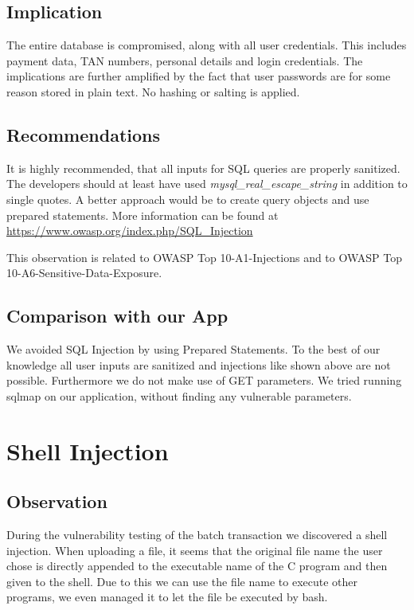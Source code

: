 \subsection{Implication}
The entire database is compromised, along with all user credentials. This includes payment data, TAN numbers, personal details and login credentials. The implications are further amplified by the fact that user passwords are for some reason stored in plain text. No hashing or salting is applied.

\subsection{Recommendations}
It is highly recommended, that all inputs for SQL queries are properly sanitized. The developers should at least have used \emph{mysql\_real\_escape\_string} in addition to single quotes. A better approach would be to create query objects and use prepared statements.
More information can be found at \url{https://www.owasp.org/index.php/SQL\_Injection}

This observation is related to OWASP Top 10-A1-Injections and to OWASP Top 10-A6-Sensitive-Data-Exposure.

\subsection{Comparison with our App}
We avoided SQL Injection by using Prepared Statements. To the best of our knowledge all user inputs are sanitized and injections like shown above are not possible. Furthermore we do not make use of GET parameters. We tried running sqlmap on our application, without finding any vulnerable parameters.

\section{Shell Injection}

\subsection{Observation}

During the vulnerability testing of the batch transaction we discovered a shell injection. When uploading a file, it seems that the original file name the user chose is directly appended to the executable name of the C program and then given to the shell. Due to this we can use the file name to execute other programs, we even managed it to let the file be executed by bash.\newline


